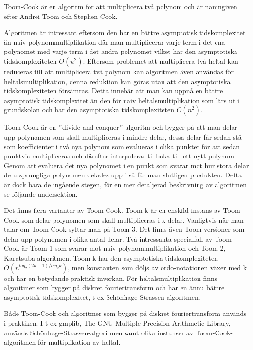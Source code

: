Toom-Cook är en algoritm för att multiplicera två polynom och är namngiven
efter Andrei Toom och Stephen Cook.

Algoritmen är intressant eftersom den har en bättre asymptotisk tidskomplexitet
än naiv polynommultiplikation där man multiplicerar varje term i det ena
polynomet med varje term i det andra polynomet vilket har den asymptotiska
tidskomplexiteten $O\left(n^2\right)$. Eftersom problemet att multiplicera två
heltal kan reduceras till att multiplicera två polynom kan algoritmen även
användas för heltalsmultiplikation, denna reduktion kan göras utan att den
asymptotiska tidskomplexiteten försämras. Detta innebär att man kan uppnå en
bättre asymptotisk tidskomplexitet än den för naiv heltalsmultiplikation som
lärs ut i grundskolan och har den asymptotiska tidskomplexiteten
$O\left(n^2\right)$.

Toom-Cook är en $"$divide and conquer$"$-algoritm och bygger på att man delar
upp polynomen som skall multipliceras i mindre delar, dessa delar får sedan stå
som koefficienter i två nya polynom som evalueras i olika punkter för att sedan
punktvis multipliceras och därefter interpoleras tillbaka till ett nytt
polynom. Genom att evaluera det nya polynomet i en punkt som svarar mot hur
stora delar de ursprungliga polynomen delades upp i så får man slutligen
produkten. Detta är dock bara de ingående stegen, för en mer detaljerad
beskrivning av algoritmen se följande undersektion.

Det finns flera varianter
av Toom-Cook. Toom-k är en enskild instans av Toom-Cook som delar polynomen som
skall multipliceras i k delar. Vanligtvis när man talar om Toom-Cook syftar man
på Toom-3. Det finns även Toom-versioner som delar upp polynomen i olika antal
delar. Två intressanta specialfall av Toom-Cook är Toom-1 som svarar mot naiv
polynommultiplikation och Toom-2, Karatsuba-algoritmen. Toom-k har den
asymptotiska tidskomplexiteten $O(n^{log_2(2 k-1)/log_2 k})$, men konstanten
som döljs av ordo-notationen växer med k och har en betydande praktisk
inverkan. För heltalsmultiplikation finns algoritmer som bygger på diskret
fouriertransform och har en ännu bättre asymptotisk tidskomplexitet, t ex
Schönhage-Strassen-algoritmen.

Både Toom-Cook och algoritmer som bygger på diskret fouriertransform används i
praktiken. I t ex gmplib, The GNU Multiple Precision Arithmetic Library,
används Schönhage-Strassen-algoritmen samt olika instanser av
Toom-Cook-algoritmen för multiplikation av heltal.

